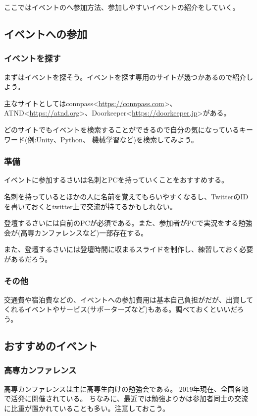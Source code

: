 \documentclass[lualatex,ja=standard,12pt,a4j]{bxjsbook}
\begin{document}
				ここではイベントのへ参加方法、参加しやすいイベントの紹介をしていく。
			\subsection{イベントへの参加}
				\subsubsection{イベントを探す}
					まずはイベントを探そう。イベントを探す専用のサイトが幾つかあるので紹介しよう。
					
					主なサイトとしてはconnpass<\url{https://connpass.com}>、ATND<\url{https://atnd.org}>、Doorkeeper<\url{https://doorkeeper.jp}>がある。
					
					どのサイトでもイベントを検索することができるので自分の気になっているキーワード(例:Unity、Python、 機械学習など)を検索してみよう。
				\subsubsection{準備}
					イベントに参加するさいは名刺とPCを持っていくことをおすすめする。
					
					名刺を持っているとほかの人に名前を覚えてもらいやすくなるし、TwitterのIDを書いておくとtwitter上で交流が持てるかもしれない。
					
					登壇するさいには自前のPCが必須である。また、参加者がPCで実況をする勉強会が(高専カンファレンスなど)一部存在する。
					
					また、登壇するさいには登壇時間に収まるスライドを制作し、練習しておく必要があるだろう。
					
					\subsubsection{その他}
						交通費や宿泊費などの、イベントへの参加費用は基本自己負担がだが、出資してくれるイベントやサービス(サポーターズなど)もある。調べておくといいだろう。
			\subsection{おすすめのイベント}
				\subsubsection{高専カンファレンス}
					高専カンファレンスは主に高専生向けの勉強会である。
					2019年現在、全国各地で活発に開催されている。
					ちなみに、最近では勉強よりかは参加者同士の交流に比重が置かれていることも多い。注意しておこう。
					
\end{document}
